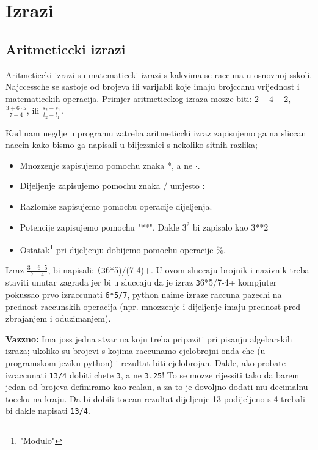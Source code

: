 \chapter{Izrazi}

\section{Aritmeticcki izrazi}

Aritmeticcki izrazi su matematiccki izrazi s kakvima se raccuna u
osnovnoj sskoli. Najccessche se sastoje od brojeva ili varijabli
koje imaju brojccanu vrijednost i matematicckih operacija. Primjer
aritmeticckog izraza mozze biti: $2+4-2$, 
$\frac{3+6\cdot 5}{7-4}$,
ili $\frac{s_2-s_1}{t_2-t_1}$. 

Kad nam negdje u programu zatreba
aritmeticcki izraz zapisujemo ga na sliccan naccin kako bismo ga napisali u
biljezznici s nekoliko sitnih razlika;

\begin{itemize}
	\item Mnozzenje zapisujemo pomochu znaka *, a ne $\cdot$.
	\item Dijeljenje zapisujemo pomochu znaka / umjesto :
	\item Razlomke zapisujemo pomochu operacije dijeljenja.
	\item Potencije zapisujemo pomochu "**". Dakle $3^2$ bi zapisalo kao
		3**2
	\item Ostatak\footnote{"Modulo"} pri dijeljenju dobijemo pomochu
		operacije \%.
\end{itemize}

Izraz 
$\frac{3+6\cdot 5}{7-4}$, bi napisali: \verb+(3+6*5)/(7-4)+. U ovom
sluccaju brojnik i nazivnik treba staviti unutar zagrada jer bi u
sluccaju da je izraz \verb+3+6*5/7-4+ kompjuter pokussao prvo
izraccunati \verb+6*5/7+, python naime izraze raccuna pazechi na
prednost raccunskih operacija (npr. mnozzenje i dijeljenje imaju
prednost pred zbrajanjem i oduzimanjem).

\textbf{Vazzno:}
Ima joss jedna stvar na koju treba pripaziti pri pisanju algebarskih
izraza; ukoliko su brojevi s kojima raccunamo cjelobrojni onda che (u
programskom jeziku python) i rezultat biti cjelobrojan. Dakle, ako probate
izraccunati \verb+13/4+ dobiti chete \verb+3+, a ne \verb+3.25+! To se
mozze rijessiti tako da barem jedan od brojeva definiramo kao realan, a za
to je dovoljno dodati mu decimalnu toccku na kraju. Da bi dobili toccan
rezultat dijeljenje 13 podijeljeno s 4 trebali bi dakle napisati
\verb+13/4+.

